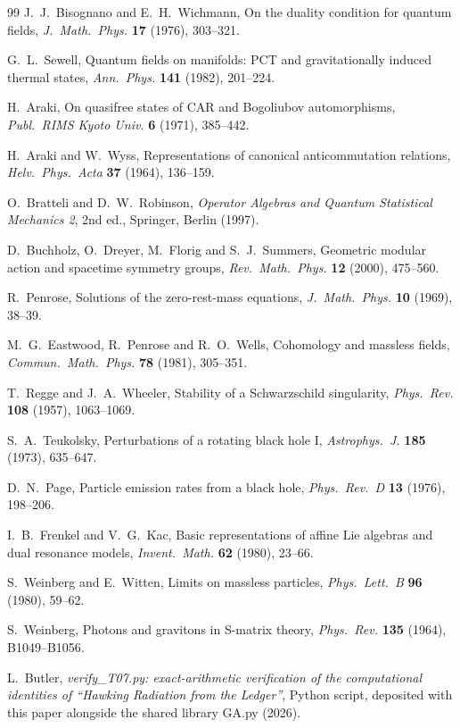 \begin{thebibliography}{99}
J.~J.~Bisognano and E.~H.~Wichmann,
On the duality condition for quantum fields,
\emph{J.\ Math.\ Phys.} \textbf{17} (1976), 303--321.

G.~L.~Sewell,
Quantum fields on manifolds: PCT and gravitationally induced thermal states,
\emph{Ann.\ Phys.} \textbf{141} (1982), 201--224.

H.~Araki,
On quasifree states of CAR and Bogoliubov automorphisms,
\emph{Publ.\ RIMS Kyoto Univ.} \textbf{6} (1971), 385--442.

H.~Araki and W.~Wyss,
Representations of canonical anticommutation relations,
\emph{Helv.\ Phys.\ Acta} \textbf{37} (1964), 136--159.

O.~Bratteli and D.~W.~Robinson,
\emph{Operator Algebras and Quantum Statistical Mechanics 2}, 2nd ed.,
Springer, Berlin (1997).

D.~Buchholz, O.~Dreyer, M.~Florig and S.~J.~Summers,
Geometric modular action and spacetime symmetry groups,
\emph{Rev.\ Math.\ Phys.} \textbf{12} (2000), 475--560.

R.~Penrose,
Solutions of the zero-rest-mass equations,
\emph{J.\ Math.\ Phys.} \textbf{10} (1969), 38--39.

M.~G.~Eastwood, R.~Penrose and R.~O.~Wells,
Cohomology and massless fields,
\emph{Commun.\ Math.\ Phys.} \textbf{78} (1981), 305--351.

T.~Regge and J.~A.~Wheeler,
Stability of a Schwarzschild singularity,
\emph{Phys.\ Rev.} \textbf{108} (1957), 1063--1069.

S.~A.~Teukolsky,
Perturbations of a rotating black hole I,
\emph{Astrophys.\ J.} \textbf{185} (1973), 635--647.

D.~N.~Page,
Particle emission rates from a black hole,
\emph{Phys.\ Rev.\ D} \textbf{13} (1976), 198--206.

I.~B.~Frenkel and V.~G.~Kac,
Basic representations of affine Lie algebras and dual resonance models,
\emph{Invent.\ Math.} \textbf{62} (1980), 23--66.

S.~Weinberg and E.~Witten,
Limits on massless particles,
\emph{Phys.\ Lett.\ B} \textbf{96} (1980), 59--62.

S.~Weinberg,
Photons and gravitons in S-matrix theory,
\emph{Phys.\ Rev.} \textbf{135} (1964), B1049--B1056.

L.~Butler,
\emph{verify\_T07.py: exact-arithmetic verification of the computational identities of ``Hawking Radiation from the Ledger''},
Python script, deposited with this paper alongside the shared library GA.py (2026).

\end{thebibliography}


